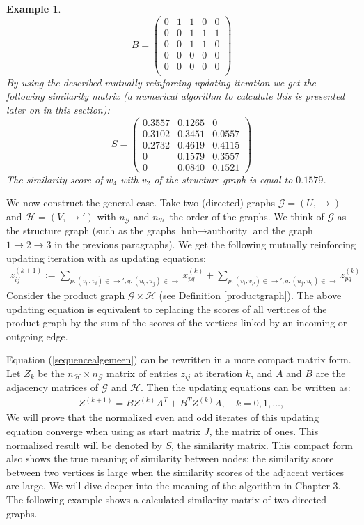 \documentclass[a4paper,11pt]{report}
\newtheorem{example}[theorem]{Example}
\newcommand{\graf}{\mathscr{G}}
\newcommand{\grafeen}{\mathscr{H}}
\begin{document}
\begin{example}
$$B = \begin{pmatrix}
0 & 1 & 1 & 0 & 0\\
0 & 0 & 1 & 1 & 1\\
0 & 0 & 1 & 1 & 0\\
0 & 0 & 0 & 0 & 0\\
0 & 0 & 0 & 0 & 0\\
\end{pmatrix}$$
 By using the described mutually reinforcing updating iteration we get the 
 following similarity matrix (a numerical algorithm to calculate this is presented later 
 on in this section):
 $$ S = \begin{pmatrix}
 0.3557 & 0.1265 & 0\\
 0.3102 & 0.3451  & 0.0557\\
 0.2732 & 0.4619 & 0.4115\\
0 & 0.1579 & 0.3557\\
 0 & 0.0840 & 0.1521
\end{pmatrix}$$
The similarity score of $w_4$ with $v_2$ of the structure graph is equal to 
$0.1579$.
 \end{example}

 We now construct the general case. Take two (directed) graphs $\graf=(U, \to)$ and $\grafeen=(V, \to')$ 
 with $n_\graf$ and $n_\grafeen$ the order of the graphs. We think of $\graf$ as the structure 
 graph (such as the graphs $\text{hub}\to \text{authority}$ and the graph $1\to 2\to 
 3$ in the previous paragraphs). We get the following mutually reinforcing updating iteration with as updating equations:
 \begin{eqnarray}\label{vergblondel}
 z^{(k+1)}_{ij} := \sum_{p:(v_p,v_i)\in \to', q:(u_q,u_j) \in \to} x^{(k)}_{pq} +  \sum_{p:(v_i,v_p)\in \to', q:(u_j,u_q) \in \to} z^{(k)}_{pq} 
 \end{eqnarray}
 Consider the product graph $\graf \times \grafeen$ (see Definition \ref{productgraph}). The above updating equation is equivalent to replacing
 the scores of all vertices of the product graph by the sum of the scores of the vertices linked by an incoming
 or outgoing edge. 
 
 Equation (\ref{sequencealgemeen}) can be rewritten in a more compact matrix form. Let $Z_k$
 be the $n_\grafeen \times n_\graf$ matrix of entries $z_{ij}$ at iteration $k$, and $A$ and $B$ are the adjacency matrices
 of $\graf$ and $\grafeen$. Then the 
 updating equations can be written as:
 \begin{eqnarray}\label{compacteforms}
Z^{(k+1)} = BZ^{(k)}A^T + B^TZ^{(k)}A,\quad k=0,1,\ldots,
  \end{eqnarray}
We will prove that the normalized even and odd iterates of 
 this updating equation converge when using as start matrix $J$, the matrix of ones. This normalized
result will be denoted by $S$,  the similarity matrix. This compact form also shows the true meaning of similarity between nodes:
the similarity score between two vertices is large when the similarity scores of the adjacent vertices are large. We will dive deeper into
the meaning of the algorithm in Chapter 3. The following example shows a calculated similarity 
 matrix of two directed graphs.
 
\end{document}
